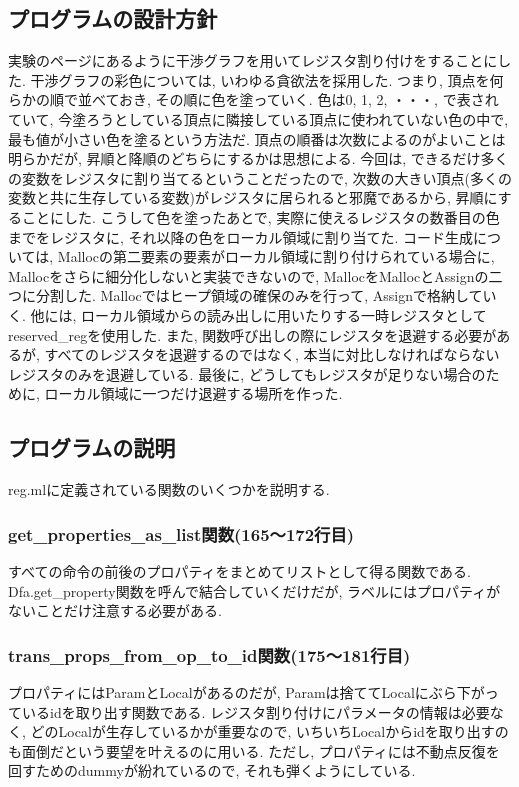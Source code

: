 \documentclass{jarticle}
\begin{document}
\subsection{プログラムの設計方針}
実験のページにあるように干渉グラフを用いてレジスタ割り付けをすることにした. 干渉グラフの彩色については, いわゆる貪欲法を採用した. つまり, 頂点を何らかの順で並べておき, その順に色を塗っていく. 色は0, 1, 2, ・・・, で表されていて, 今塗ろうとしている頂点に隣接している頂点に使われていない色の中で, 最も値が小さい色を塗るという方法だ. 頂点の順番は次数によるのがよいことは明らかだが, 昇順と降順のどちらにするかは思想による. 今回は, できるだけ多くの変数をレジスタに割り当てるということだったので, 次数の大きい頂点(多くの変数と共に生存している変数)がレジスタに居られると邪魔であるから, 昇順にすることにした. こうして色を塗ったあとで, 実際に使えるレジスタの数番目の色までをレジスタに, それ以降の色をローカル領域に割り当てた. コード生成については, Mallocの第二要素の要素がローカル領域に割り付けられている場合に, Mallocをさらに細分化しないと実装できないので, MallocをMallocとAssignの二つに分割した. Mallocではヒープ領域の確保のみを行って, Assignで格納していく. 他には, ローカル領域からの読み出しに用いたりする一時レジスタとしてreserved\_regを使用した. また, 関数呼び出しの際にレジスタを退避する必要があるが, すべてのレジスタを退避するのではなく, 本当に対比しなければならないレジスタのみを退避している. 最後に, どうしてもレジスタが足りない場合のために, ローカル領域に一つだけ退避する場所を作った.
\subsection{プログラムの説明}
reg.mlに定義されている関数のいくつかを説明する.
\subsubsection{get\_properties\_as\_list関数(165〜172行目)}
すべての命令の前後のプロパティをまとめてリストとして得る関数である. Dfa.get\_property関数を呼んで結合していくだけだが, ラベルにはプロパティがないことだけ注意する必要がある.
\subsubsection{trans\_props\_from\_op\_to\_id関数(175〜181行目)}
プロパティにはParamとLocalがあるのだが, Paramは捨ててLocalにぶら下がっているidを取り出す関数である. レジスタ割り付けにパラメータの情報は必要なく, どのLocalが生存しているかが重要なので, いちいちLocalからidを取り出すのも面倒だという要望を叶えるのに用いる. ただし, プロパティには不動点反復を回すためのdummyが紛れているので, それも弾くようにしている.
\end{document}
